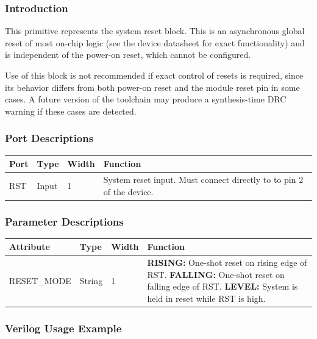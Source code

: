 \documentclass{article}
\begin{document}
\subsubsection{Introduction}
This primitive represents the system reset block. This is an asynchronous global reset of most on-chip logic (see the
device datasheet for exact functionality) and is independent of the power-on reset, which cannot be configured.

Use of this block is not recommended if exact control of resets is required, since its behavior differs from both 
power-on reset and the module reset pin in some cases. A future version of the toolchain may produce a synthesis-time 
DRC warning if these cases are detected.

\subsubsection{Port Descriptions}

\begin{tabularx}{5in}{|l|l|l|X|}
\hline
{\bfseries Port} & {\bfseries Type} & {\bfseries Width} & {\bfseries Function} \\
\hline
RST & Input & 1 & System reset input. Must connect directly to to pin 2 of the device.\\
\hline
\end{tabularx}

\subsubsection{Parameter Descriptions}

\begin{tabularx}{5in}{|l|l|l|X|}
\hline
{\bfseries Attribute} & {\bfseries Type} & {\bfseries Width} & {\bfseries Function} \\
\hline
RESET\_MODE & String & 1 & 
	{\bfseries RISING: } \newline One-shot reset on rising edge of RST. \newline
	{\bfseries FALLING: } \newline One-shot reset on falling edge of RST. \newline
	{\bfseries LEVEL: } \newline System is held in reset while RST is high.\\
\hline
\end{tabularx}

\subsubsection{Verilog Usage Example}
\end{document}
